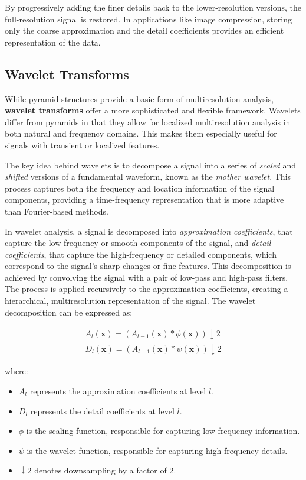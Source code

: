 By progressively adding the finer details back to the lower-resolution versions, the full-resolution signal is restored. In applications like image compression, storing only the coarse approximation and the detail coefficients provides an efficient representation of the data.

\subsection{Wavelet Transforms}

While pyramid structures provide a basic form of multiresolution analysis, \textbf{wavelet transforms} offer a more sophisticated and flexible framework. Wavelets differ from pyramids in that they allow for localized multiresolution analysis in both natural and frequency domains. This makes them especially useful for signals with transient or localized features.


The key idea behind wavelets is to decompose a signal into a series of \textit{scaled} and \textit{shifted} versions of a fundamental waveform, known as the \textit{mother wavelet}. This process captures both the frequency and location information of the signal components, providing a time-frequency representation that is more adaptive than Fourier-based methods.

In wavelet analysis, a signal is decomposed into \textit{approximation coefficients}, that capture the low-frequency or smooth components of the signal, and \textit{detail coefficients}, that capture the high-frequency or detailed components, which correspond to the signal's sharp changes or fine features. This decomposition is achieved by convolving the signal with a pair of low-pass and high-pass filters. The process is applied recursively to the approximation coefficients, creating a hierarchical, multiresolution representation of the signal. The wavelet decomposition can be expressed as:

\begin{align}
  A_l(\mathbf{x}) = \left( A_{l-1}(\mathbf{x}) * \phi(\mathbf{x}) \right) \downarrow 2
  \\
  D_l(\mathbf{x}) = \left( A_{l-1}(\mathbf{x}) * \psi(\mathbf{x}) \right) \downarrow 2
\end{align}

where:
\begin{itemize}
  \item \( A_l \) represents the approximation coefficients at level \( l \).
  \item \( D_l \) represents the detail coefficients at level \( l \).
  \item \( \phi \) is the scaling function, responsible for capturing low-frequency information.
  \item \( \psi \) is the wavelet function, responsible for capturing high-frequency details.
  \item \( \downarrow 2 \) denotes downsampling by a factor of 2.
\end{itemize}

